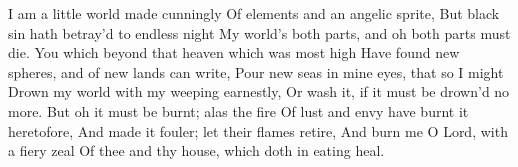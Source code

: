 \documentclass[fontsize=9, a5paper]{scrbook}
\newcommand\blankpage{%
    \null
    \thispagestyle{empty}%
    \addtocounter{page}{-1}%
    \newpage}
\begin{document}
\pagebreak

\afterpage{\blankpage}
\begin{poem}

	\begin{stanza}
		I am a little world made cunningly\verseline
		Of elements and an angelic sprite,\verseline
		But black sin hath betray'd to endless night\verseline
		My world's both parts, and oh both parts must die.\verseline
		You which beyond that heaven which was most high\verseline
		Have found new spheres, and of new lands can write,\verseline
		Pour new seas in mine eyes, that so I might\verseline
		Drown my world with my weeping earnestly,\verseline
		Or wash it, if it must be drown'd no more.\verseline
		But oh it must be burnt; alas the fire\verseline
		Of lust and envy have burnt it heretofore,\verseline
		And made it fouler; let their flames retire,\verseline
		And burn me O Lord, with a fiery zeal\verseline
		Of thee and thy house, which doth in eating heal.
	\end{stanza}

\end{poem}

\pagebreak
\end{document}
